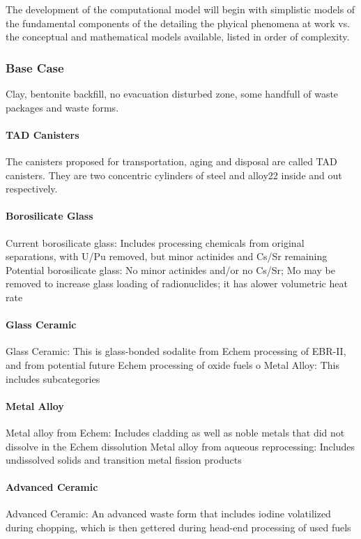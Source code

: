 The development of the computational model will begin with simplistic models of  
the fundamental components of the detailing the phyical phenomena at work vs.  
the conceptual and mathematical models available, listed in order of complexity.


\subsubsection{Base Case}

Clay, bentonite backfill, no evacuation disturbed zone, some handfull of waste 
packages and waste forms.




\paragraph{TAD Canisters} The canisters proposed for transportation, aging and 
disposal are called TAD canisters.  They are two concentric cylinders of steel 
and alloy22 inside and out respectively. 


\paragraph{Borosilicate Glass} Current borosilicate glass: Includes processing 
chemicals from original separations, with U/Pu removed, but minor actinides and 
Cs/Sr remaining Potential borosilicate glass: No minor actinides and/or no 
Cs/Sr; Mo may be removed to increase glass loading of radionuclides; it has 
alower volumetric heat rate


\paragraph{Glass Ceramic} Glass Ceramic:  This is glass-bonded sodalite from 
Echem processing of EBR-II, and from potential future Echem processing of oxide 
fuels o Metal Alloy: This includes subcategories


\paragraph{Metal Alloy} Metal alloy from Echem: Includes cladding as well as 
noble metals that did not dissolve in the Echem dissolution Metal alloy from 
aqueous reprocessing:  Includes undissolved solids and transition metal fission 
products


\paragraph{Advanced Ceramic} Advanced Ceramic: An advanced waste form that 
includes iodine volatilized during chopping, which is then gettered during 
head-end processing of used fuels



